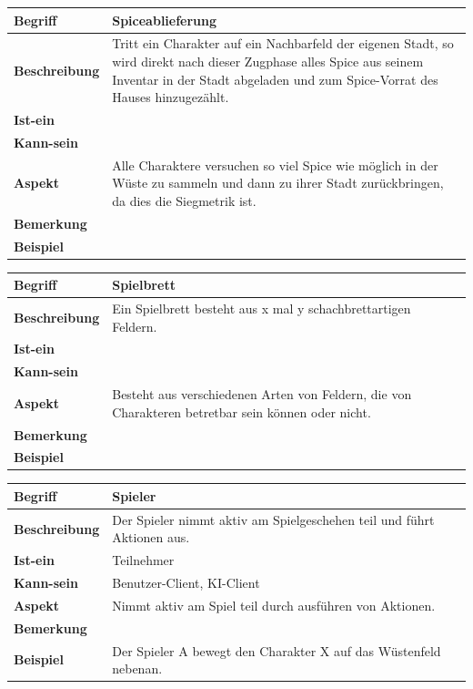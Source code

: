 \documentclass{uulm-assignment}
\begin{document}
\begin{tabularx}{16cm}{|l|X|}
\hline
\textbf{Begriff} & \textbf{Spiceablieferung} \\
\hline
\textbf{Beschreibung} & Tritt ein Charakter auf ein Nachbarfeld der eigenen Stadt, so wird direkt nach dieser Zugphase alles Spice aus seinem Inventar in der Stadt abgeladen und zum Spice-Vorrat des Hauses hinzugezählt. \\
\hline
\textbf{Ist-ein} & \\
\hline
\textbf{Kann-sein} & \\
\hline
\textbf{Aspekt} & Alle Charaktere versuchen so viel Spice wie möglich in der Wüste zu sammeln und dann zu ihrer Stadt zurückbringen, da dies die Siegmetrik ist.\\
\hline
\textbf{Bemerkung} &  \\
\hline
\textbf{Beispiel} &  \\
\hline
\end{tabularx}

\begin{tabularx}{16cm}{|l|X|}
\hline
\textbf{Begriff} & \textbf{Spielbrett} \\
\hline
\textbf{Beschreibung} & Ein Spielbrett besteht aus x mal y schachbrettartigen Feldern.  \\
\hline
\textbf{Ist-ein} & \\
\hline
\textbf{Kann-sein} & \\
\hline
\textbf{Aspekt} & Besteht aus verschiedenen Arten von Feldern, die von Charakteren betretbar sein können oder nicht. \\
\hline
\textbf{Bemerkung} &  \\
\hline
\textbf{Beispiel} &  \\
\hline
\end{tabularx}

\begin{tabularx}{16cm}{|l|X|}
\hline
\textbf{Begriff} & \textbf{Spieler} \\
\hline
\textbf{Beschreibung} & Der Spieler nimmt aktiv am Spielgeschehen teil und führt Aktionen aus. \\
\hline
\textbf{Ist-ein} & Teilnehmer \\
\hline
\textbf{Kann-sein} & Benutzer-Client, KI-Client\\
\hline
\textbf{Aspekt} & Nimmt aktiv am Spiel teil durch ausführen von Aktionen.\\
\hline
\textbf{Bemerkung} &  \\
\hline
\textbf{Beispiel} & Der Spieler A bewegt den Charakter X auf das Wüstenfeld nebenan. \\
\hline
\end{tabularx}
\end{document}
